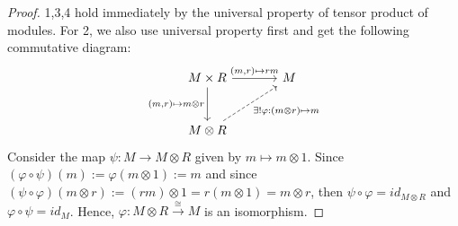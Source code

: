 \begin{proof}
    1,3,4 hold immediately by the universal property of tensor product of modules. For 2, we also use universal property first and get the following commutative diagram:
    \[
    \begin{tikzcd}[row sep=large, column sep=large]
    M \times R \arrow[r, "{(m,r)} \mapsto rm"] \arrow[d, "{(m,r)} \mapsto m \otimes r"'] & M \\
    M \otimes R \arrow[ur, dashed, "\exists! \varphi: (m\otimes r) \mapsto m"'] & 
    \end{tikzcd}
    \]
    Consider the map $\psi: M \to M\otimes R$ given by $m \mapsto m\otimes 1$. Since $(\varphi \circ \psi) (m) := \varphi (m \otimes 1) := m$ and since $(\psi \circ \varphi) (m \otimes r) := (rm) \otimes 1 = r(m \otimes 1) = m \otimes r$, then $\psi \circ \varphi =id_{M \otimes R}$ and $\varphi\circ \psi=id_M$. Hence, $\varphi: M \otimes R \overset{\cong}{\to} M$ is an isomorphism.
\end{proof}

